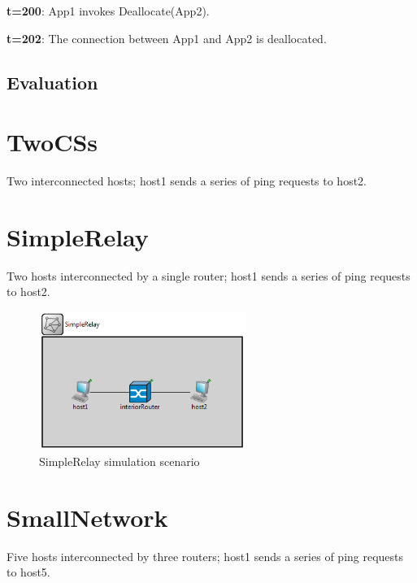             \textbf{t=200}: App1 invokes Deallocate(App2).

            \textbf{t=202}: The connection between App1 and App2 is deallocated.

        \subsection{Evaluation}


    \section{TwoCSs}

        Two interconnected hosts; host1 sends a series of ping requests to host2.


    \section{SimpleRelay}

        Two hosts interconnected by a single router; host1 sends a series of ping requests to host2.

        \begin{figure}[H]
            \begin{center}
                \includegraphics[width=0.6\textwidth]{fig/examples-simplerelay.png}
              \caption{SimpleRelay simulation scenario}
              \label{fig:examples:simplerelay}
            \end{center}
        \end{figure}

    \section{SmallNetwork}

        Five hosts interconnected by three routers; host1 sends a series of ping requests to host5.

